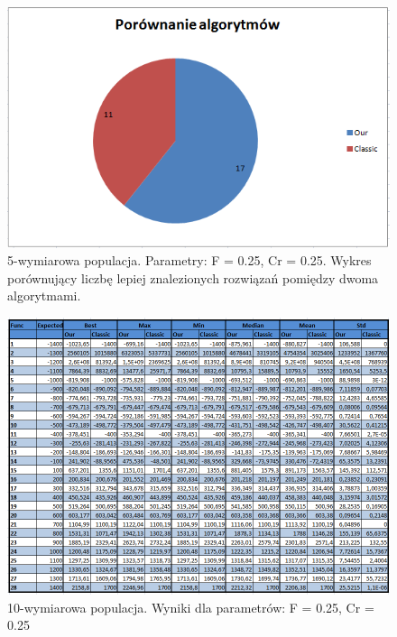 \documentclass[a4paper]{article}
\begin{document}
\begin{figure}[!h]
\centering
\includegraphics[width=\textwidth]{F75Cr75L5statystyka.png}
\caption{5-wymiarowa populacja. Parametry: F = 0.25, Cr = 0.25. Wykres porównujący liczbę lepiej znalezionych rozwiązań pomiędzy dwoma algorytmami.}
\end{figure}

\begin{figure}[!h]
\centering
\includegraphics[width=\textwidth]{F25Cr25L10tab.png}
\caption{10-wymiarowa populacja. Wyniki dla parametrów: F = 0.25, Cr = 0.25}
\end{figure}
\end{document}
